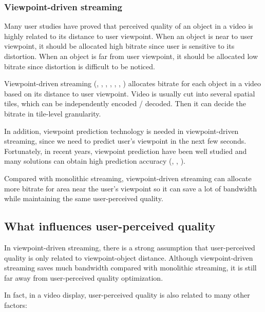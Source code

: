 \subsubsection{Viewpoint-driven streaming}
Many user studies have proved that perceived quality of an object in a video is highly related to its distance to user viewpoint. When an object is near to user viewpoint, it should be allocated high bitrate since user is sensitive to its distortion. When an object is far from user viewpoint, it should be allocated low bitrate since distortion is difficult to be noticed.

Viewpoint-driven streaming (\cite{viewpoint-driven1}, \cite{viewpoint-driven2}, \cite{viewpoint-driven3}, \cite{viewpoint-driven4}, \cite{viewpoint-driven5}, \cite{viewpoint-driven6}, \cite{Flare}) allocates bitrate for each object in a video based on its distance to user viewpoint. Video is usually cut into several spatial tiles, which can be independently encoded / decoded. Then it can decide the bitrate in tile-level granularity.

In addition, viewpoint prediction technology is needed in viewpoint-driven streaming, since we need to predict user's viewpoint in the next few seconds. Fortunately, in recent years, viewpoint prediction have been well studied and many solutions can obtain high prediction accuracy (\cite{viewpoint-driven1}, \cite{VPprediction}, \cite{Flare}).

Compared with monolithic streaming, viewpoint-driven streaming can allocate more bitrate for area near the user's viewpoint so it can save a lot of bandwidth while maintaining the same user-perceived quality.

\subsection{What influences user-perceived quality}
In viewpoint-driven streaming, there is a strong assumption that user-perceived quality is only related to viewpoint-object distance. Although viewpoint-driven streaming saves much bandwidth compared with monolithic streaming, it is still far away from user-perceived quality optimization.

In fact, in a video display, user-perceived quality is also related to many other factors:

